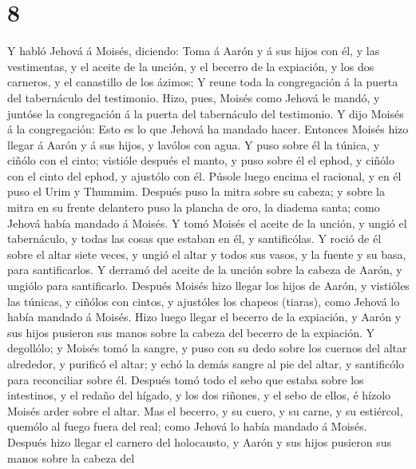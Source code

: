 \hypertarget{section-7}{%
\section{8}\label{section-7}}

 Y habló Jehová á Moisés, diciendo:  Toma á
Aarón y á sus hijos con él, y las vestimentas, y el aceite de la unción,
y el becerro de la expiación, y los dos carneros, y el canastillo de los
ázimos;  Y reune toda la congregación á la puerta del
tabernáculo del testimonio.  Hizo, pues, Moisés como
Jehová le mandó, y juntóse la congregación á la puerta del tabernáculo
del testimonio.  Y dijo Moisés á la congregación: Esto es
lo que Jehová ha mandado hacer.  Entonces Moisés hizo
llegar á Aarón y á sus hijos, y lavólos con agua.  Y puso
sobre él la túnica, y ciñólo con el cinto; vistióle después el manto, y
puso sobre él el ephod, y ciñólo con el cinto del ephod, y ajustólo con
él.  Púsole luego encima el racional, y en él puso el Urim
y Thummim.  Después puso la mitra sobre su cabeza; y sobre
la mitra en su frente delantero puso la plancha de oro, la diadema
santa; como Jehová había mandado á Moisés.  Y tomó Moisés
el aceite de la unción, y ungió el tabernáculo, y todas las cosas que
estaban en él, y santificólas.  Y roció de él sobre el
altar siete veces, y ungió el altar y todos sus vasos, y la fuente y su
basa, para santificarlos.  Y derramó del aceite de la
unción sobre la cabeza de Aarón, y ungiólo para santificarlo.
 Después Moisés hizo llegar los hijos de Aarón, y
vistióles las túnicas, y ciñólos con cintos, y ajustóles los chapeos
(tiaras), como Jehová lo había mandado á Moisés.  Hizo
luego llegar el becerro de la expiación, y Aarón y sus hijos pusieron
sus manos sobre la cabeza del becerro de la expiación.  Y
degollólo; y Moisés tomó la sangre, y puso con su dedo sobre los cuernos
del altar alrededor, y purificó el altar; y echó la demás sangre al pie
del altar, y santificólo para reconciliar sobre él. 
Después tomó todo el sebo que estaba sobre los intestinos, y el redaño
del hígado, y los dos riñones, y el sebo de ellos, é hízolo Moisés arder
sobre el altar.  Mas el becerro, y su cuero, y su carne,
y su estiércol, quemólo al fuego fuera del real; como Jehová lo había
mandado á Moisés.  Después hizo llegar el carnero del
holocausto, y Aarón y sus hijos pusieron sus manos sobre la cabeza del
